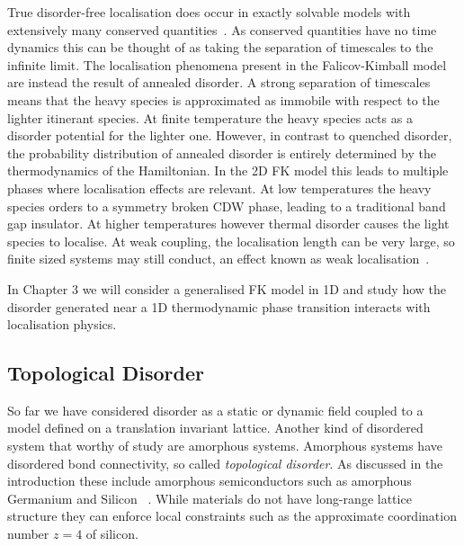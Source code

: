 True disorder-free localisation does occur in exactly solvable models with extensively many conserved quantities~\autocite{smithDisorderFreeLocalization2017}. As conserved quantities have no time dynamics this can be thought of as taking the separation of timescales to the infinite limit. The localisation phenomena present in the Falicov-Kimball model are instead the result of annealed disorder. A strong separation of timescales means that the heavy species is approximated as immobile with respect to the lighter itinerant species. At finite temperature the heavy species acts as a disorder potential for the lighter one. However, in contrast to quenched disorder, the probability distribution of annealed disorder is entirely determined by the thermodynamics of the Hamiltonian. In the 2D FK model this leads to multiple phases where localisation effects are relevant. At low temperatures the heavy species orders to a symmetry broken CDW phase, leading to a traditional band gap insulator. At higher temperatures however thermal disorder causes the light species to localise. At weak coupling, the localisation length can be very large, so finite sized systems may still conduct, an effect known as weak localisation~\autocite{antipovInteractionTunedAndersonMott2016}.

In Chapter 3 we will consider a generalised FK model in 1D and study how the disorder generated near a 1D thermodynamic phase transition interacts with localisation physics.

\hypertarget{topological-disorder}{%
\subsection{Topological Disorder}\label{topological-disorder}}

So far we have considered disorder as a static or dynamic field coupled to a model defined on a translation invariant lattice. Another kind of disordered system that worthy of study are amorphous systems. Amorphous systems have disordered bond connectivity, so called \emph{topological disorder}. As discussed in the introduction these include amorphous semiconductors such as amorphous Germanium and Silicon ~\autocite{Yonezawa1983,zallen2008physics,Weaire1971,betteridge1973possible}. While materials do not have long-range lattice structure they can enforce local constraints such as the approximate coordination number \(z = 4\) of silicon.

